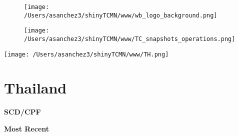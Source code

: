 \documentclass{article}\usepackage[]{graphicx}\usepackage[]{color}
\begin{document}
\newpage
\begin{figure}
  \vspace{-3ex} %
  \hspace{-7ex} %
  \texttt{[image: /Users/asanchez3/shinyTCMN/www/wb\_logo\_background.png]}
\end{figure}
\begin{figure}
  \begin{minipage}[t]{0.99\textwidth} %
      \vspace{-30ex}
      \hspace{-2ex}
      \raggedright{\texttt{[image: /Users/asanchez3/shinyTCMN/www/TC\_snapshots\_operations.png]}}
  \end{minipage}
\end{figure}
%
\begin{minipage}[t]{0.99\textwidth} %
  \vspace{-1.5cm}
  \begin{minipage}[c]{0.36\textwidth} 
    \begin{minipage}[c]{0.28\textwidth} %
      \texttt{[image: /Users/asanchez3/shinyTCMN/www/TH.png]}
    \end{minipage}
    \begin{minipage}[c]{0.70\textwidth} %
      \section*{\color{blue!40!black}Thailand}
    \end{minipage}
  \end{minipage}
  \begin{minipage}[c]{0.63\textwidth}
  \end{minipage}  
\end{minipage} %

  \raggedright{\color{white!30!blue} \textbf{\Large SCD/CPF}}
    \begin{minipage}[c]{0.99\textwidth}  
      \vspace*{0.2cm}
      \raggedright{\color{white!30!blue} \textbf{\large Most Recent}}
      \vspace*{0.3cm}
      

      \vspace*{0.5cm}
    \end{minipage}
    
\end{document}
